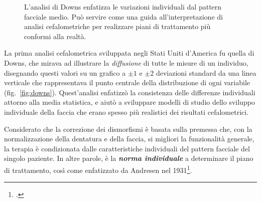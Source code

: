 \begin{figure}[!h]
\centering
{}
\caption{L'analisi di Downs enfatizza le variazioni individuali dal pattern facciale medio. Può servire come una guida all'interpretazione di analisi cefalometriche per realizzare piani di trattamento più conformi alla realtà.}
\label{fig:downs}
\end{figure}

La prima analisi cefalometrica sviluppata negli Stati Uniti d'America fu quella di Downs, che mirava ad illustrare la \textit{diffusione} di tutte le misure di un individuo, disegnando questi valori su un grafico a $\pm1$ e $\pm2$ deviazioni standard da una linea verticale che rappresentava il punto centrale della distribuzione di ogni variabile (fig.~\vref{fig:downs}). Quest'analisi enfatizzò la consistenza delle differenze individuali attorno alla media statistica, e aiutò a sviluppare modelli di studio dello sviluppo individuale della faccia che erano spesso più realistici dei risultati cefalometrici.

Considerato che la correzione dei dismorfismi è basata sulla premessa che, con la normalizzazione della dentatura e della faccia, si migliori la funzionalità generale, la terapia è condizionata dalle caratteristiche individuali del pattern facciale del singolo paziente. In altre parole, è la \textbf{\textit{norma individuale}} a determinare il piano di trattamento, così come enfatizzato da Andresen nel 1931\footcite{Andresen1931,Andresen1944}.

